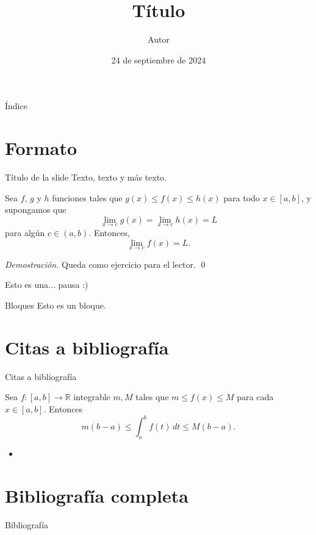 \documentclass[
    10pt,
    spanish,
    t %
]{beamer}
\title{Título}
\author{Autor}
\institute{Instituto}
\date{24 de septiembre de 2024}
\theoremstyle{definition} %
\theoremstyle{remark} %
\theoremstyle{plain} %
\theoremstyle{plain} %
\theoremstyle{plain} %
\theoremstyle{plain} %
\theoremstyle{plain} %
\newenvironment{dem}{\noindent\textit{Demostración.}}{\hfill\qed\par\vspace{10pt}}
\begin{document}
\begin{frame}
    \titlepage
\end{frame}

\begin{frame}{Índice}
    \tableofcontents[hideallsubsections]
\end{frame}


\section{Formato}

\begin{frame}{Título de la slide}
    Texto, texto y más texto.
    
    \begin{theorem}
    Sea $f$, $g$ y $h$ funciones tales que $g(x) \leq f(x) \leq h(x)$ para todo $x \in [a,b]$, y supongamos que
    \[
    \lim_{x \to c} g(x) = \lim_{x \to c} h(x) = L
    \]
    para algún $c \in (a,b)$. Entonces, 
    \[
    \lim_{x \to c} f(x) = L.
    \]
    \end{theorem}
    \begin{dem}
        Queda como ejercicio para el lector.
    \end{dem}
\end{frame}

\begin{frame}
    Esto es una... \pause pausa :)\pause
    \begin{block}{Bloques}
        Esto es un bloque.
    \end{block}
\end{frame}


\section{Citas a bibliografía}

\begin{frame}{Citas a bibliografía}
    \begin{theorem}
        Sea $f:[a, b]\to\mathbb{R}$ integrable $m, M$ tales que $m \leq f(x) \leq M$ para cada $x \in [a,b]$. Entonces
        \[
        m(b-a) \leq \int_a^b f(t)\, dt \leq M(b-a).
        \]
    \end{theorem}
    \nobibliography*
    \begin{itemize}
        \item {}
    \end{itemize}
\end{frame}


\section{Bibliografía completa}

\begin{frame}{Bibliografía}
    \nocite{*}
    
    
\end{frame}
    
\end{document}
